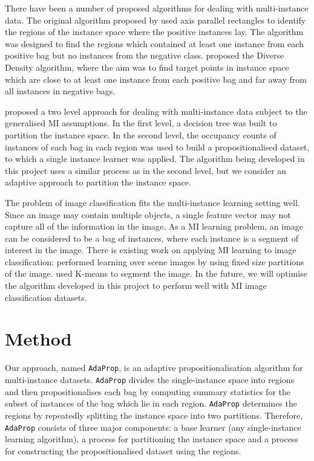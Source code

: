 \documentclass[a4paper,12pt]{report} %
\newcommand{\AdaProp}{\texttt{AdaProp}\xspace}
\begin{document}
There have been a number of proposed algorithms 
    for dealing with multi-instance data. 
The original algorithm proposed by  
    used axis parallel rectangles to identify the regions of the instance space 
    where the positive instances lay. 
The algorithm was designed to find the regions which 
    contained at least one instance from each positive bag 
    but no instances from the negative class. 
 proposed the Diverse Density algorithm, 
    where the aim was to find target points in instance space 
    which are close to at least one instance from each positive bag and 
    far away from all instances in negative bags.

 proposed a two level approach for dealing with multi-instance data 
    subject to the generalised MI assumptions. 
In the first level, 
    a decision tree was built to partition the instance space. 
In the second level, 
    the occupancy counts of instances of each bag in each region 
    was used to build a propositionalised dataset, 
    to which a single instance learner was applied.
The algorithm being developed in this project uses a similar process 
    as  in the second level, 
    but we consider an adaptive approach to partition the instance space.

The problem of image classification fits the multi-instance learning setting well. 
Since an image may contain multiple objects, 
    a single feature vector may not capture all 
    of the information in the image. 
As a MI learning problem, 
    an image can be considered to be a bag of instances, 
    where each instance is a segment of interest in the image. 
There is existing work on applying MI learning to image classification: 
     performed learning over scene images by 
        using fixed size partitions of the image. 
     used K-means to segment the image. 
In the future, 
    we will optimise the algorithm developed in this project to perform well 
    with MI image classification datasets.

\chapter{Method}

Our approach, named \AdaProp, is an adaptive propositionalisation algorithm 
    for multi-instance datasets.
\AdaProp divides the single-instance space
    into regions and then propositionalises each bag 
    by computing summary statistics for the 
    subset of instances of the bag which lie in each region.
\AdaProp determines the regions by repeatedly splitting the instance space into 
    two partitions.
Therefore, \AdaProp consists of three major components: 
    a base learner (any single-instance learning algorithm),
    a process for partitioning the instance space and 
    a process for constructing the propositionalised dataset using the regions.
\end{document}
